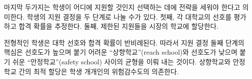 \documentclass[12pt]{article} %
\newif\ifEN
\theoremstyle{definition}
\theoremstyle{definition}
\begin{document}
\ifEN{
The coexistence of an application limit and uncertainty in college preferences requires students to strategize in selecting the set of schools to which they apply. We can think of the student’s application decision of consisting of two parts: First, she must rank the colleges by preferability and identify her admissions probability at each. Second, she must allocate her limited applications across the set of schools in the market.

For a typical student, college preferability and admissions probability are negatively correlated. Thus, the second stage of the application decision boils down to trading off schools that are desirable but hard to get into (reach schools) with schools that are less desirable but easy to get into (safety schools). The optimal allocation between reach schools and safety schools depends on the individual student’s tolerance for risk.
} \else{
마지막 두가지는 학생이 어디에 지원할 것인지 선택하는 데에 전략을 세워야 한다고 의미한다. 학생의 지원 결정을 두 단계로 나눌 수가 있다. 첫째, 각 대학교의 선호를 평가하고 합격 확률을 추정한다. 둘째, 제한된 지원들을 시장의 학교에 할당한다.

전형적인 학생은 대학 선호와 합격 확률이 반비례된다. 따라서 지원 결정 둘째 단계의 핵심은 선호도가 높으며 붙기 어려운 “상향학교”(reach school)와 선호도가 낮으며 붙기 쉬운 “안정학교”(safety school) 사이의 균형을 이뤄 내는 것이다. 상향학교와 안정학교 간의 최적 할당은 학생 개개인의 위험감수도의 의존한다.
}\fi
\end{document}
